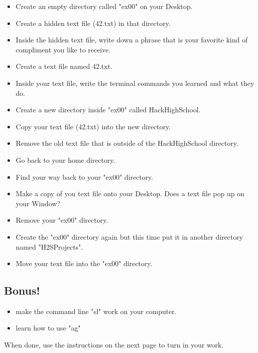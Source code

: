 \documentclass{42-en}
\begin{document}
\begin{itemize}

	\item Create an empty directory called "ex00" on your Desktop.
	\item Create a hidden text file (42.txt) in that directory.
	\item Inside the hidden text file, write down a phrase that is your favorite kind of compliment you like to receive.
	\item Create a text file named 42.txt.
	\item Inside your text file, write the terminal commands you learned and what they do.
	\item Create a new directory inside "ex00" called HackHighSchool.
	\item Copy your text file (42.txt) into the new directory.
	\item Remove the old text file that is outside of the HackHighSchool directory.
	\item Go back to your home directory.
	\item Find your way back to your "ex00" directory.
	\item Make a copy of you text file onto your Desktop. Does a text file pop up on your Window?
	\item Remove your "ex00" directory.
	\item Create the "ex00" directory again but this time put it in another directory named "H2SProjects".
	\item Move your text file into the "ex00" directory.\\

\end{itemize}


\subsection{Bonus!}
\begin{itemize}

	\item make the command line "sl" work on your computer.
	\item learn how to use "ag"

\end{itemize}


When done, use the instructions on the next page to turn in your work.

\end{document}
